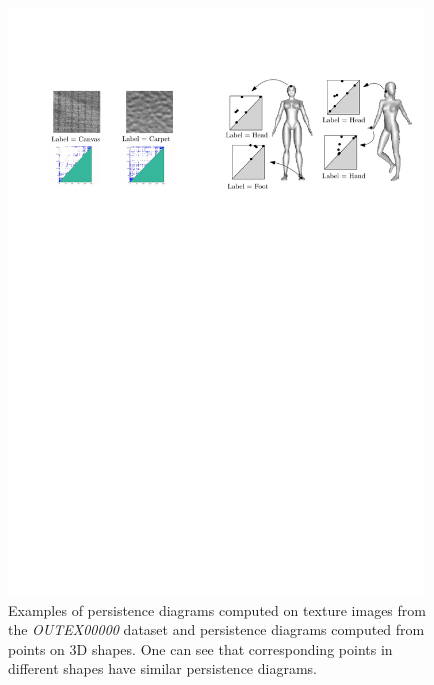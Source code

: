 \begin{figure}[t] 
\centering
\includegraphics[width=0.98\textwidth]{figures/task2}
\caption[Texture and 3D point classification]{\label{fig:task2} Examples of persistence diagrams computed on texture images from the \emph{OUTEX00000} dataset
and persistence diagrams computed from points on 3D shapes. One can see that corresponding points in different shapes have
similar persistence diagrams.}
\end{figure}

